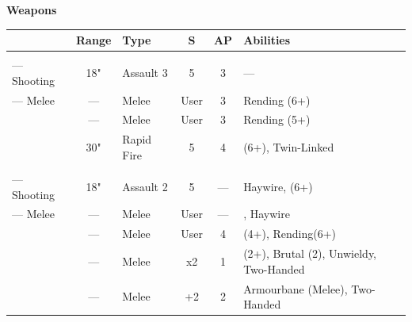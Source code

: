 \begin{minipage}[t]{0.72\textwidth}
	\vspace*{2em}
	\textbf{Weapons}
	
	\begin{tabular}{L{90 pt} c C{40pt} *{2}{c} >{\raggedright\arraybackslash}p{130pt}}
		& Range & Type & S & AP & Abilities \\
		\hline
		 & & &  &  &  \\
		— Shooting & 18" & Assault 3 & 5 & 3 & — \\
		— Melee & — & Melee & User & 3 & Rending (6+) \\
		 & — & Melee & User & 3 & Rending (5+) \\
		 & 30" & Rapid Fire & 5 & 4 &  (6+), Twin-Linked \\	
		 & & &  &  &  \\
		— Shooting & 18" & Assault 2 & 5 & — & Haywire,  (6+) \\
		— Melee & — & Melee & User & — & , Haywire \\
		 & — & Melee & User & 4 &  (4+), Rending(6+) \\
		 & — & Melee & x2 & 1 &  (2+), Brutal (2), Unwieldy, Two-Handed \\
		 & — & Melee & +2 & 2 & Armourbane (Melee), Two-Handed \\
	\end{tabular}
	

\end{minipage}
